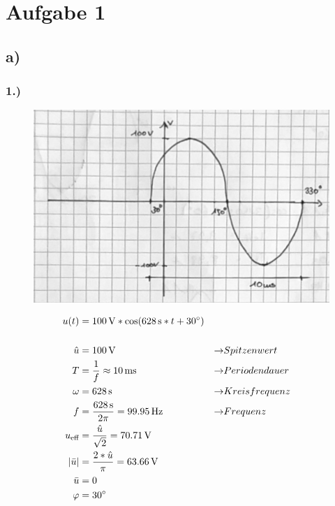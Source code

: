 \documentclass[../../document.tex]{subfiles}
\begin{document}
\section*{Aufgabe 1}

\subsection*{a)}

\subsubsection*{1.)}

\begin{figure}[H]
    \begin{center}
        \includegraphics[width=.9\linewidth]{../../img/aufg1-a-1}
    \end{center}
\end{figure}

\begin{equation*}
    \begin{split}
        u(t) &= \SI{100}{\volt} * \cos(\SI{628}{\second} * t + \SI{30}{\degree})\\\\
        \hat{u} &= \SI{100}{\volt} &\rightarrow &  Spitzenwert\\
        T &= \frac{1}{f} \approx \SI{10}{ms} &\rightarrow &  Periodendauer\\
        \omega &= \SI{628}{\second} &\rightarrow &  Kreisfrequenz\\
        f &= \frac{\SI{628}{\second}}{2\pi} = \SI{99,95}{\hertz} &\rightarrow &  Frequenz\\
        u_{\textrm{eff}} &= \frac{\hat{u}}{\sqrt{2}} = \SI{70,71}{\volt}\\
        \left\lvert\bar{u}\right\rvert &= \frac{2 * \hat{u}}{\pi} = \SI{63,66}{\volt}\\ 
        \bar{u} &= 0\\
        \varphi &= \SI{30}{\degree}\\
    \end{split}
\end{equation*}
\end{document}
